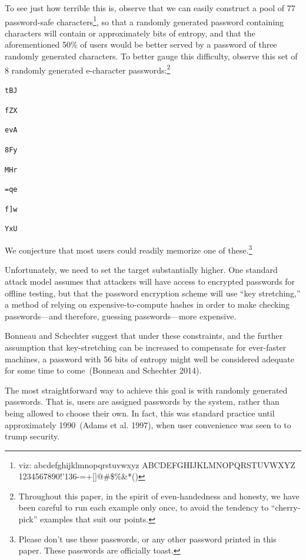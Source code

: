\documentclass[preprint]{soups}
\newcommand{\Scribtexttt}[1]{{\texttt{#1}}}
\newenvironment{SingleColumn}{\begin{list}{}{\topsep=0pt\partopsep=0pt%
\listparindent=0pt\itemindent=0pt\labelwidth=0pt\leftmargin=0pt\rightmargin=0pt%
\itemsep=0pt\parsep=0pt}\item}{\end{list}}
\newcommand{\NoteBox}[1]{\footnote{#1}}
\newcommand{\NoteContent}[1]{#1}
\begin{document}
To see just how terrible this is, observe that we can easily construct
a pool of 77 password{-}safe characters\NoteBox{\NoteContent{viz: abcdefghijklmnopqrstuvwxyz
ABCDEFGHIJKLMNOPQRSTUVWXYZ
1234567890!{\char'136}{-}=+[]@\#\$\%\&*()}},
so that a randomly generated password containing  characters will
contain  or approximately  bits of entropy,
and that the aforementioned 50\% of users would be better served by a
password of three randomly generated characters. To better gauge this
difficulty, observe this set of 8 randomly generated e{-}character passwords:\NoteBox{\NoteContent{Throughout this paper, in the spirit of even{-}handedness and honesty, we have
been careful to run each example only once, to avoid the tendency to {``}cherry{-}pick{''}
examples that suit our points.}}

\begin{SingleColumn}\Scribtexttt{tBJ}

\Scribtexttt{fZX}

\Scribtexttt{evA}

\Scribtexttt{8Fy}

\Scribtexttt{MHr}

\Scribtexttt{=qe}

\Scribtexttt{f]w}

\Scribtexttt{YxU}\end{SingleColumn}

We conjecture that most users could readily memorize one of
these.\NoteBox{\NoteContent{Please don{'}t use these passwords, or any other
password printed in this paper. These passwords are
officially toast.}}

Unfortunately, we need to set the target substantially higher. One
standard attack model assumes that attackers will have access to
encrypted passwords for offline testing, but that the password
encryption scheme will use {``}key stretching,{''} a method of relying
on expensive{-}to{-}compute hashes in order to make checking passwords{---}and
therefore, guessing passwords{---}more expensive.

Bonneau and Schechter suggest that under these constraints,
and the further assumption that key{-}stretching can be
increased to compensate for ever{-}faster machines, a password
with 56 bits of entropy might well be considered adequate
for some time to come~(Bonneau and Schechter 2014).

The most straightforward way to achieve this goal is with
randomly generated passwords. That is, users are assigned
passwords by the system, rather than being allowed to choose
their own. In fact, this was standard practice until
approximately 1990~(Adams et al. 1997), when
user convenience was seen to to trump security.
\end{document}
